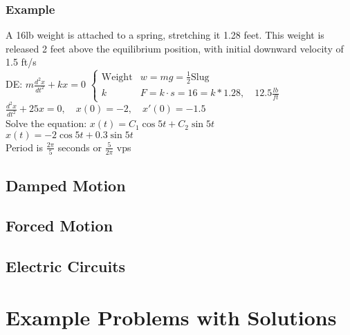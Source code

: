 \documentclass{article}
\begin{document}
\subsubsection{Example}
A 16lb weight is attached to a spring, stretching it 1.28 feet. This weight is released 2 feet above the equilibrium position, with initial downward velocity of 1.5 ft/s
\\DE: $m\frac{d^2x}{dt^2}+kx=0$
$\begin{cases}
    \text{Weight}&w=mg=\frac{1}{2} \text{Slug}
    \\k&F=k\cdot s = 16=k*1.28,\quad 12.5 \frac{lb}{ft}
\end{cases}$
\\$\frac{d^2x}{dt^2}+25x=0,\quad x(0)=-2,\quad x'(0)=-1.5$
\\Solve the equation: $x(t)=C_1\cos 5t +C_2\sin 5t $
\\$x(t)=-2\cos 5t + 0.3\sin 5t$
\\Period is $\frac{2\pi}{5}$ seconds or $\frac{5}{2\pi}$ vps
\subsection{Damped Motion}
\subsection{Forced Motion}
\subsection{Electric Circuits}













\pagebreak
\section{Example Problems with Solutions}
\end{document}
